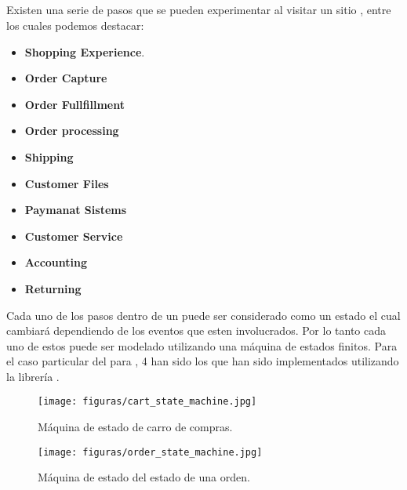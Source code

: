 
\subsection{\workflowsCPT}


Existen una serie de pasos que se pueden experimentar al visitar un sitio \ecommerceCOM, entre los cuales podemos destacar:

	\begin{itemize}
		\item
			\textbf{Shopping Experience}.
		\item
			\textbf{Order Capture} 
		\item
			\textbf{Order Fullfillment} 
		\item
			\textbf{Order processing}
		\item
			\textbf{Shipping} 
		\item
			\textbf{Customer Files} 
		\item
			\textbf{Paymanat Sistems} 
		\item
			\textbf{Customer Service} 
		\item
			\textbf{Accounting} 
		\item
			\textbf{Returning} 
	\end{itemize}


Cada uno de los pasos dentro de un \workflowsCPT puede ser considerado como un estado el cual cambiará dependiendo de los eventos que esten involucrados. Por lo tanto cada uno de estos \workflowsCPT puede ser modelado utilizando una máquina de estados finitos.
Para el caso particular del \frameworkPC para \ecommerceCOM, 4 han sido los \workflowsCPT que han sido implementados utilizando la librería \javaScriptNAME \finiteStateMachine.

\begin{figure}[H]
	\centering
	\texttt{[image: figuras/cart\_state\_machine.jpg]}

	\caption{Máquina de estado de carro de compras.}
	\label{figure:cart_state_machine}
\end{figure}


\begin{figure}[H]
	\centering
	\texttt{[image: figuras/order\_state\_machine.jpg]}

	\caption{Máquina de estado del estado de una orden.}
	\label{figure:order_state_machine}
\end{figure}

